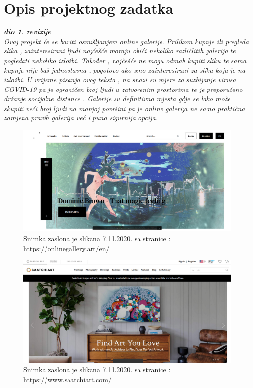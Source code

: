 \chapter{Opis projektnog zadatka}
		
		\textbf{\textit{dio 1. revizije}}\\
		
		\textit{Ovaj projekt će se baviti osmišljanjem online galerije. Prilikom kupnje ili pregleda slika , zainteresirani ljudi najćešće moraju obići nekoliko različlitih galerija te pogledati nekoliko 				izložbi. Također , najčešće ne mogu odmah kupiti sliku te sama kupnja nije baš jednostavna , pogotovo ako smo zainteresirani za sliku koja je na izložbi.  U vrijeme pisanja ovog 				teksta , na snazi su mjere za suzbijanje virusa COVID-19 pa je ograničen broj ljudi u zatvorenim prostorima te je preporučeno držanje socijalne distance . Galerije su definitivno 				mjesta gdje se lako može skupiti 		veći broj ljudi na manjoj površini pa je online galerija ne samo praktična zamjena pravih galerija  već i puno sigurnija opcija. 			}
		\graphicspath{ {./slike/} }
				\begin{figure}[H]
					\includegraphics[width=\textwidth,height=\textheight,keepaspectratio]{onlinegallery_art}
					\caption{Snimka zaslona je slikana 7.11.2020. sa stranice : https://onlinegallery.art/en/ }
					
				\end{figure}
		\graphicspath{ {./slike/} }
				\begin{figure}[H]
					\includegraphics[width=\textwidth,height=\textheight,keepaspectratio]{saatchiart_com}
					\caption{Snimka zaslona je slikana 7.11.2020. sa stranice : https://www.saatchiart.com/}
					
				\end{figure}	
			
